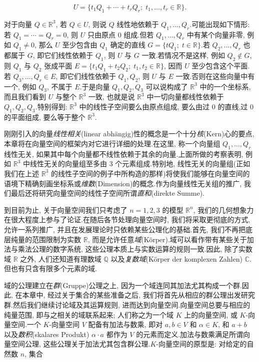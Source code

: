 \[
U = \{t_1 Q_1 + \cdots + t_r Q_r;\; t_1, \ldots, t_r \in \mathbb{R}\}.
\]

对于向量 $Q \in \mathbb{R}^3$, 若 $Q \in U$, 则说 $Q$ 线性地依赖于 $Q_1, \ldots, Q_r$.可能出现如下情形: 若 $Q_1 = \cdots = Q_r = 0$, 则 $U$ 只由原点 $0$ 组成.但若 $Q_1, \ldots, Q_r$ 中有某个向量非零, 例如 $Q_1 \neq 0$, 那么 $U$ 至少包含由 $Q_1$ 确定的直线 $G = \{t Q_1;\; t \in \mathbb{R}\}$.若 $Q_2, \ldots, Q_r$ 也都属于 $G$, 即它们线性依赖于 $Q_1$, 则 $U$ 与 $G$ 一致.若情况不是这样, 例如 $Q_2 \notin G$, 则 $Q_1$ 与 $Q_2$ 张成平面 $E = \{t_1 Q_1 + t_2 Q_2;\; t_1, t_2 \in \mathbb{R}\}$, 因而 $U$ 至少包含这个平面.若 $Q_3, \ldots, Q_r \in E$, 即它们线性依赖于 $Q_1, Q_2$, 则 $U$ 与 $E$ 一致.否则在这些向量中有一个, 例如 $Q_3$, 不属于 $E$.于是向量 $Q_1, Q_2, Q_3$ 可以说构成了 $\mathbb{R}^3$ 中的一个坐标系, 而且我们看到 $U$ 与整个 $\mathbb{R}^3$ 一致, 也就是说 $\mathbb{R}^3$ 中一切向量都线性依赖于 $Q_1, Q_2, Q_3$.特别得到: $\mathbb{R}^3$ 中的线性子空间要么由原点组成, 要么由过 $0$ 的直线,过 $0$ 的平面组成, 要么等于整个 $\mathbb{R}^3$.

刚刚引入的向量\emph{线性相关}(\textup{linear abhängig})性的概念是一个十分\emph{核}(\textup{Kern})心的要点, 本章将在向量空间的框架内对它进行详细的处理.在这里, 称一个向量组 $Q_1, \ldots, Q_r$ 线性无关, 如果其中每个向量都不线性依赖于其余的向量.上面所做的考察表明, 例如 $\mathbb{R}^3$ 中线性无关的向量组至多由 $3$ 个元素组成.特别地, 线性无关的向量组(正如我们在上述 $\mathbb{R}^3$ 的线性子空间的例子中所构造的那样)将使我们能够在向量空间的语境下精确刻画坐标系或\emph{维数}(\textup{Dimension})的概念.作为向量线性无关组的推广, 我们最后还将研究向量空间的线性子空间所谓\emph{直和}(\textup{direkte Summe}).

到目前为止, 关于向量空间我们只考虑了 $n = 1, 2, 3$ 的模型 $\mathbb{R}^n$, 我们的几何想象力在很大程度上参与了论证.在随后各节处理向量空间时, 我们将采取更彻底的方式, 允许一系列推广, 并且在发展理论时只依赖某些公理化的基础.首先, 我们不再把底层纯量的范围限制为实数 $\mathbb{R}$, 而是允许任意\emph{域}(\textup{Körper}).域可以看作带有某些关于加法与乘法公理的数字系统, 这些公理本质上与实数运算的规则一致.因此, 除了实数域 $\mathbb{R}$ 之外, 人们还知道有理数域 $\mathbb{Q}$ 以及\emph{复数域}(\textup{Körper der komplexen Zahlen}) $\mathbb{C}$.但也有只含有限多个元素的域.

域的公理建立在\emph{群}(\textup{Gruppe})公理之上, 因为一个域连同其加法尤其构成一个群.因此, 在本章中, 经过关于集合的某些准备之后, 我们将首先从相应的群公理出发研究群.然后我们继续讨论域及其运算规则, 进而达到向量空间.向量空间总要与相应的纯量范围, 即与之相关的域联系起来; 人们称之为一个域 $K$ 上的向量空间, 或 $K$-向量空间.一个 $K$-向量空间 $V$ 配备有加法与数乘, 即对 $a, b \in V$ 和 $\alpha \in K$, 和 $a + b$ 以及\emph{数积}(\textup{skalares Produkt}) $\alpha \cdot a$ 都作为 $V$ 的元素而定义.加法与数乘满足所谓向量空间公理, 这些公理关于加法尤其包含群公理.$K$-向量空间的原型是: 对给定的自然数 $n$, 集合

